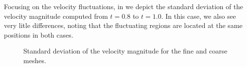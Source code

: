 Focusing on the velocity fluctuations, in  we depict the standard deviation of the velocity magnitude computed from $ t=0.8 $ to $ t=1.0 $. In this case, we also see very litle differences, noting that the fluctuating regions are located at the same positions in both cases.
\begin{figure}[h!]
  \centering
  \caption{Standard deviation of the velocity magnitude for the fine and coarse meshes.}
  \label{fig-NACA_dev_velo}
\end{figure}

